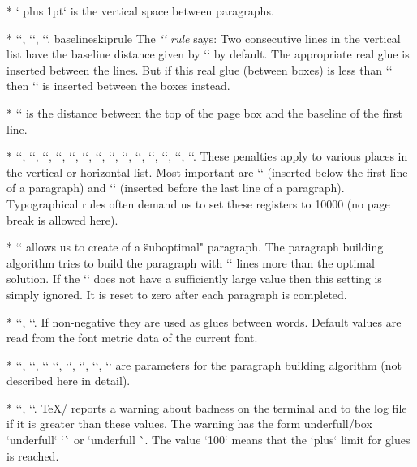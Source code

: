 {* \y`\parskip=0pt plus 1pt` is the vertical space between paragraphs.

* \y`\baselineskip=12pt`,
  \y`\lineskiplimit=0pt`,
  \y`\lineskip=1pt`.
  \ii baselineskiprule The {\em `\baselineskip` rule} says: 
  Two consecutive lines in the vertical list have the baseline distance given 
  by \x`\baselineskip` by default. The appropriate real glue is inserted
  between the lines.
  But if this real glue (between boxes) is less than \x`\lineskiplimit` 
  then \x`\lineskip` is inserted between the boxes instead.

* \y`\topskip=10pt` is the distance between the top of the page box and the baseline of
  the first line.

* \y``,
  \y``,
  \y``,
  \y``,
  \y``,
  \y``,
  \y``,
  \y``,
  \y``,
  \y``,
  \y``,
  \y``,
  \y``,
  \y``.
  These penalties apply to various places in the vertical or horizontal
  list. Most important are \x`\clubpenalty` (inserted below the first line of a paragraph)
  and \x`\widowpenalty` (inserted before the last line of a paragraph). Typographical rules
  often demand us to set these registers to 10000 (no page break is allowed here).

* \y`` allows us to create of a \"suboptimal" paragraph. The
  paragraph building
  algorithm tries to build the paragraph with \x`\looseness` lines more than
  the optimal solution. If the {\noda\x`\tolerance`} does not have a sufficiently large value
  then this setting is simply ignored. It is reset to zero after each
  paragraph is completed.

* \y`\spaceskip=0pt`,
  \y`\xspaceskip=0pt`. If non-negative they are used as glues between words.
  Default values are read from the font metric data of the current font.

* \y``,
  \y``, \y`\emergencystretch=0pt`
  \y``,
  \y``,
  \y``,
  \y`\hfuzz=0.1pt`,
  \y`\vfuzz=0.1pt`
are parameters for the paragraph building algorithm (not described here in
detail).

* \y``,
  \y``. \TeX/ reports a warning about \iid badness on the terminal
  and to the log file if it is greater than these values. The warning has the form
  \ii underfull/box `underfull` `\hbox` or `underfull \vbox`. The value `100`
  means that the `plus` limit for glues is reached.

}
